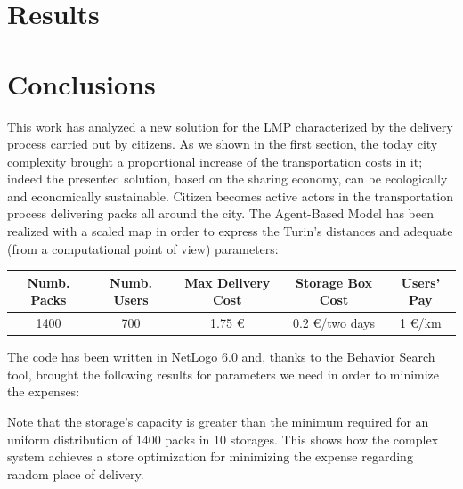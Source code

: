 \documentclass[11pt,a4paper]{article}
\begin{document}

\newpage
\section{Results}

\newpage
\section{Conclusions}
This work has analyzed a new solution for the LMP characterized by the delivery process carried out by citizens. As we shown in the first section, the today city complexity brought a proportional increase of the transportation costs in it; indeed the presented solution, based on the sharing economy, can be ecologically and economically sustainable. Citizen becomes active actors in the transportation process delivering packs all around the city. The Agent-Based Model has been realized with a scaled map in order to express the Turin's distances and adequate (from a computational point of view) parameters: 
\begin{center}
\begin{tabular}{c|c|c|c|c}
 \hline 
 Numb. Packs & Numb. Users & Max Delivery Cost & Storage Box Cost & Users' Pay \\ 
 \hline 
 \hline
 1400 & 700 & 1.75 \euro{} & 0.2 \euro{}/two days & 1 \euro{}/km \\ 
 \hline 
\end{tabular} 
\end{center} 
The code has been written in NetLogo 6.0 and, thanks to the Behavior Search tool, brought the following results for parameters we need in order to minimize the expenses: 
\begin{center}
 \end{center}
Note that the storage's capacity is greater than the minimum required for an uniform distribution of 1400 packs in 10 storages. This shows how the complex system achieves a store optimization for minimizing the expense regarding random place of delivery.
\bigskip
\end{document}
